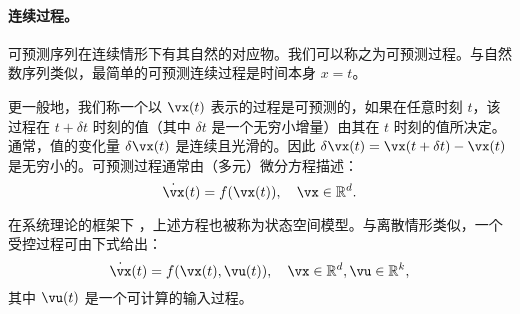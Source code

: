 \documentclass[../../book-main_zh.tex]{subfiles}
\begin{document}

\paragraph{连续过程。}
可预测序列在连续情形下有其自然的对应物。我们可以称之为可预测过程。与自然数序列类似，最简单的可预测连续过程是时间本身 $x=t$。

更一般地，我们称一个以 $\vx(t)$ 表示的过程是可预测的，如果在任意时刻 $t$，该过程在 $t+\delta t$ 时刻的值（其中 $\delta t$ 是一个无穷小增量）由其在 $t$ 时刻的值所决定。通常，值的变化量 $\delta \vx(t)$ 是连续且光滑的。因此 $\delta \vx(t) = \vx(t + \delta t) - \vx(t)$ 是无穷小的。可预测过程通常由（多元）微分方程描述：
\begin{equation}
    \dot{\vx}(t) = f(\vx(t)), \quad \vx \in \mathbb{R}^d. 
    \label{eqn:process}
\end{equation}

在系统理论的框架下 \cite{Cal:Des,Sastry-Nonlinear}，上述方程也被称为状态空间模型。与离散情形类似，一个受控过程可由下式给出：
\begin{equation}
    \dot{\vx}(t) = f(\vx(t), \vu(t) ), \quad \vx \in \mathbb{R}^d, \vu \in \mathbb{R}^k,
    \label{eqn:process-controlled}
\end{equation}
其中 $\vu(t)$ 是一个可计算的输入过程。
\end{document}
